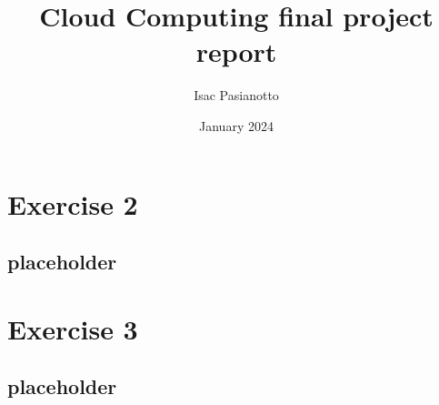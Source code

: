 \documentclass[a4paper]{article}
\begin{document}
\title{Cloud Computing final project report}
\author{Isac Pasianotto}
\date{January 2024}
\maketitle
\tableofcontents
\newpage



\section{Exercise 2}

\subsection{placeholder}

\section{Exercise 3}

\subsection{placeholder}
\end{document}
